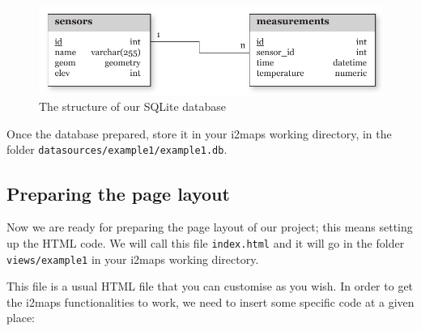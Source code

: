 \documentclass[11pt]{article}
\begin{document}
\begin{figure}
	\begin{center}
	\includegraphics[]{figures/ex1_dbstructure.pdf}
	\caption{The structure of our SQLite database}
	\label{fig:ex1_dbstructure}
	\end{center}
\end{figure}

Once the database prepared, store it in your i2maps working directory, in the folder \texttt{datasources/example1/example1.db}.



\subsection{Preparing the page layout}

Now we are ready for preparing the page layout of our project; this means setting up the HTML code. We will call this file \texttt{index.html} and it will go in the folder \texttt{views/example1} in your i2maps working directory.

This file is a usual HTML file that you can customise as you wish. In order to get the i2maps functionalities to work, we need to insert some specific code at a given place:
\end{document}
